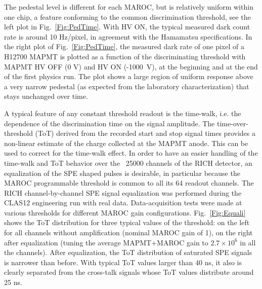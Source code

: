 \documentclass[final,5p,times,twocolumn]{elsarticle}
\begin{document}
The pedestal level is different for each MAROC, but is relatively uniform
within one chip, a feature conforming to the common discrimination threshold, see the left plot in Fig.~\ref{Fig:PedTime}.
With HV ON, the typical measured dark count rate is around 10 Hz/pixel, in agreement with the Hamamatsu specifications.
In the right plot of Fig.~\ref{Fig:PedTime}, the measured dark rate of one pixel of a H12700 MAPMT is plotted as a function 
of the discriminating threshold with MAPMT HV OFF (0 V) and HV ON (-1000~V), at the beginning and at the end of
the first physics run. The plot shows a large region of uniform response above a very narrow pedestal (as expected from the 
laboratory characterization) that stays unchanged over time. 

A typical feature of any constant threshold readout is the time-walk, i.e. the dependence of the discrimination time 
on the signal amplitude. The time-over-threshold (ToT) derived from the recorded start and stop signal times provides a 
non-linear estimate of the charge collected at the MAPMT anode. This can be used to correct for the time-walk effect. In order to 
have an easier handling of the time-walk and ToT behavior over the ~25000 channels of the RICH detector,
an equalization of the SPE shaped pulses is desirable, in particular because the MAROC programmable threshold is 
common to all its 64 readout channels.  The RICH channel-by-channel SPE signal 
equalization was performed during the CLAS12 engineering run with real data. Data-acquisition tests were made at various 
thresholds for different MAROC gain configurations. Fig.~\ref{Fig:Equali} shows the ToT distribution for 
three typical values of the threshold: on the left for all channels without amplification (nominal MAROC gain of 1),
on the right after equalization (tuning the average MAPMT+MAROC gain to $2.7\times 10^6$ in all the channels).
After equalization, the ToT distribution of saturated SPE signals is narrower than before. With typical ToT values 
larger than 40 ns, it also is clearly separated from the cross-talk signals whose ToT values distribute around 25 ns.
\end{document}
